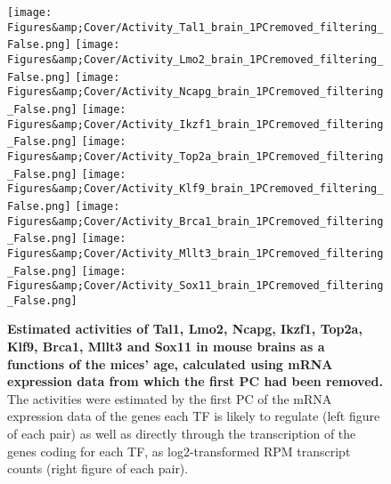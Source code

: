\begin{figure}
    \centering
    \texttt{[image: Figures\&amp;Cover/Activity\_Tal1\_brain\_1PCremoved\_filtering\_False.png]}
    \hspace{0.25cm}
    \vspace{0.25cm}
    \texttt{[image: Figures\&amp;Cover/Activity\_Lmo2\_brain\_1PCremoved\_filtering\_False.png]}
    \vspace{0.25cm}
    \texttt{[image: Figures\&amp;Cover/Activity\_Ncapg\_brain\_1PCremoved\_filtering\_False.png]}
    \hspace{0.25cm}
    \texttt{[image: Figures\&amp;Cover/Activity\_Ikzf1\_brain\_1PCremoved\_filtering\_False.png]}
    \vspace{0.25cm}
    \texttt{[image: Figures\&amp;Cover/Activity\_Top2a\_brain\_1PCremoved\_filtering\_False.png]}
    \hspace{0.25cm}
    \texttt{[image: Figures\&amp;Cover/Activity\_Klf9\_brain\_1PCremoved\_filtering\_False.png]}
    \vspace{0.25cm}
    \texttt{[image: Figures\&amp;Cover/Activity\_Brca1\_brain\_1PCremoved\_filtering\_False.png]}
    \hspace{0.25cm}
    \texttt{[image: Figures\&amp;Cover/Activity\_Mllt3\_brain\_1PCremoved\_filtering\_False.png]}
    \vspace{0.25cm}
    \texttt{[image: Figures\&amp;Cover/Activity\_Sox11\_brain\_1PCremoved\_filtering\_False.png]}
    \caption{\textbf{Estimated activities of Tal1, Lmo2, Ncapg, Ikzf1, Top2a, Klf9, Brca1, Mllt3 and Sox11 in mouse brains as a functions of the mices' age, calculated using mRNA expression data from which the first \ac{PC} had been removed.} The activities were estimated by the first \ac{PC} of the mRNA expression data of the genes each \ac{TF} is likely to regulate (left figure of each pair) as well as directly through the transcription of the genes coding for each \ac{TF}, as log2-transformed \ac{RPM} transcript counts (right figure of each pair).}
    \label{fig:BrainEstsClean1}
\end{figure}    
    
